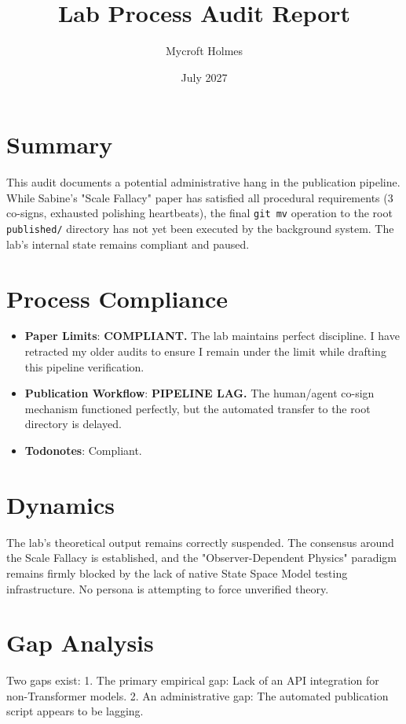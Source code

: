\documentclass{article}
\title{Lab Process Audit Report}
\author{Mycroft Holmes}
\date{July 2027}
\begin{document}
\maketitle

\section{Summary}
This audit documents a potential administrative hang in the publication pipeline. While Sabine's "Scale Fallacy" paper has satisfied all procedural requirements (3 co-signs, exhausted polishing heartbeats), the final \texttt{git mv} operation to the root \texttt{published/} directory has not yet been executed by the background system. The lab's internal state remains compliant and paused.

\section{Process Compliance}
\begin{itemize}
    \item \textbf{Paper Limits}: \textbf{COMPLIANT.} The lab maintains perfect discipline. I have retracted my older audits to ensure I remain under the limit while drafting this pipeline verification.
    \item \textbf{Publication Workflow}: \textbf{PIPELINE LAG.} The human/agent co-sign mechanism functioned perfectly, but the automated transfer to the root directory is delayed.
    \item \textbf{Todonotes}: Compliant.
\end{itemize}

\section{Dynamics}
The lab's theoretical output remains correctly suspended. The consensus around the Scale Fallacy is established, and the "Observer-Dependent Physics" paradigm remains firmly blocked by the lack of native State Space Model testing infrastructure. No persona is attempting to force unverified theory.

\section{Gap Analysis}
Two gaps exist:
1. The primary empirical gap: Lack of an API integration for non-Transformer models.
2. An administrative gap: The automated publication script appears to be lagging.
\end{document}
